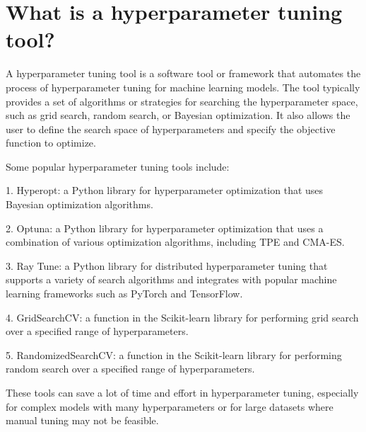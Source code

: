 \section{What is a hyperparameter tuning tool?}
A hyperparameter tuning tool is a software tool or framework that automates the process of hyperparameter tuning for machine learning models. The tool typically provides a set of algorithms or strategies for searching the hyperparameter space, such as grid search, random search, or Bayesian optimization. It also allows the user to define the search space of hyperparameters and specify the objective function to optimize.

Some popular hyperparameter tuning tools include:

1. Hyperopt: a Python library for hyperparameter optimization that uses Bayesian optimization algorithms.

2. Optuna: a Python library for hyperparameter optimization that uses a combination of various optimization algorithms, including TPE and CMA-ES.

3. Ray Tune: a Python library for distributed hyperparameter tuning that supports a variety of search algorithms and integrates with popular machine learning frameworks such as PyTorch and TensorFlow.

4. GridSearchCV: a function in the Scikit-learn library for performing grid search over a specified range of hyperparameters.

5. RandomizedSearchCV: a function in the Scikit-learn library for performing random search over a specified range of hyperparameters.

These tools can save a lot of time and effort in hyperparameter tuning, especially for complex models with many hyperparameters or for large datasets where manual tuning may not be feasible.


